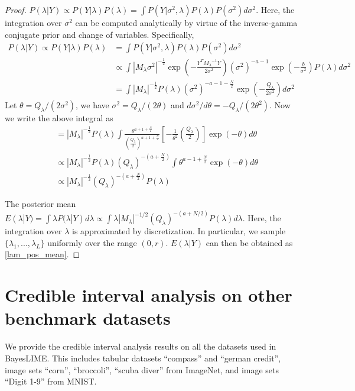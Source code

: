 \documentclass{article}
\theoremstyle{plain}
\theoremstyle{definition}
\theoremstyle{remark}
\begin{document}
\begin{proof} $P(\lambda|Y) \propto P(Y|\lambda)P(\lambda) = \int P(Y|\sigma^2,\lambda)P(\lambda)P(\sigma^2)d\sigma^2$. Here, the integration over $\sigma^2$ can be computed analytically by virtue of the inverse-gamma conjugate prior and change of variables. Specifically,
\begin{equation}
\begin{aligned}
    P(\lambda|Y) \propto P(Y|\lambda)P(\lambda) 
    &= \int P(Y|\sigma^2,\lambda)P(\lambda)P(\sigma^2)d\sigma^2\\
    &\propto \int |M_\lambda\sigma^2|^{-\frac{1}{2}}\exp{(-\frac{Y^T{M_\lambda}^{-1}Y}{2\sigma^2})}(\sigma^2)^{-a-1}\exp{(-\frac{b}{\sigma^2})}P(\lambda)d\sigma^2 \\
    &= \int |M_\lambda|^{-\frac{1}{2}}P(\lambda)(\sigma^2)^{-a-1-\frac{N}{2}}\exp{(-\frac{Q_\lambda}{2\sigma^2})} d\sigma^2
\end{aligned}
\end{equation}
Let $\theta =Q_\lambda/(2\sigma^2)$, we have $\sigma^2 = Q_\lambda/(2\theta)$ and $d\sigma^2/d\theta = -Q_\lambda/(2\theta^2)$. Now we write the above integral as
\begin{equation*}
\begin{aligned}
    &= |M_\lambda|^{-\frac{1}{2}}P(\lambda) \int\frac{\theta^{a+1+\frac{N}{2}}}{(\frac{Q_\lambda}{2})^{a+1+\frac{N}{2}}} [-\frac{1}{\theta^2}(\frac{Q_\lambda}{2})]\exp{(-\theta)}d\theta \\
    &\propto |M_\lambda|^{-\frac{1}{2}}P(\lambda)(Q_\lambda)^{-(a+\frac{N}{2})}\int\theta^{a-1+\frac{N}{2}}\exp{(-\theta)}d\theta \\
    &\propto |M_\lambda|^{-\frac{1}{2}}(Q_\lambda)^{-(a+\frac{N}{2})}P(\lambda)
\end{aligned}
\end{equation*}

The posterior mean $E(\lambda|Y) = \int \lambda P(\lambda|Y)d\lambda \propto \int \lambda |M_{\lambda}|^{-1/2}(Q_{\lambda})^{-(a+N/2)}P(\lambda)d\lambda$. Here, the integration over $\lambda$ is approximated by discretization. In particular, we sample $\{\lambda_1,...,\lambda_L\}$ uniformly over the range $(0,r)$. $E(\lambda|Y)$ can then be obtained as \cref{lam_pos_mean}.
\end{proof}

\section{Credible interval analysis on other benchmark datasets}\label{other_dataset}
We provide the credible interval analysis results on all the datasets used in BayesLIME. This includes tabular datasets “compass” and “german credit”, image sets “corn”, “broccoli”, “scuba diver” from ImageNet, and image sets “Digit 1-9” from MNIST. 
\end{document}
